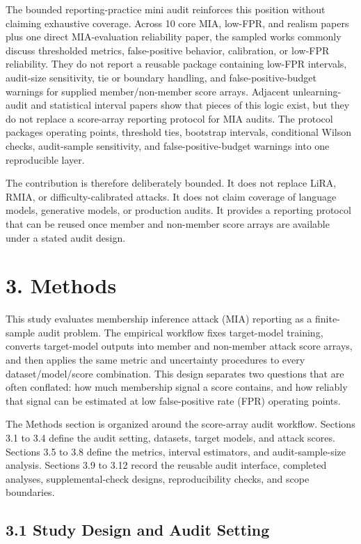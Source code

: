 \documentclass[
  10pt,
  twocolumn]{article}
\begin{document}
The bounded reporting-practice mini audit reinforces this position without claiming exhaustive coverage. Across 10 core MIA, low-FPR, and realism papers plus one direct MIA-evaluation reliability paper, the sampled works commonly discuss thresholded metrics, false-positive behavior, calibration, or low-FPR reliability. They do not report a reusable package containing low-FPR intervals, audit-size sensitivity, tie or boundary handling, and false-positive-budget warnings for supplied member/non-member score arrays. Adjacent unlearning-audit and statistical interval papers show that pieces of this logic exist, but they do not replace a score-array reporting protocol for MIA audits. The protocol packages operating points, threshold ties, bootstrap intervals, conditional Wilson checks, audit-sample sensitivity, and false-positive-budget warnings into one reproducible layer.

The contribution is therefore deliberately bounded. It does not replace LiRA, RMIA, or difficulty-calibrated attacks. It does not claim coverage of language models, generative models, or production audits. It provides a reporting protocol that can be reused once member and non-member score arrays are available under a stated audit design.

\hypertarget{methods}{%
\section{3. Methods}\label{methods}}

This study evaluates membership inference attack (MIA) reporting as a finite-sample audit problem. The empirical workflow fixes target-model training, converts target-model outputs into member and non-member attack score arrays, and then applies the same metric and uncertainty procedures to every dataset/model/score combination. This design separates two questions that are often conflated: how much membership signal a score contains, and how reliably that signal can be estimated at low false-positive rate (FPR) operating points.

The Methods section is organized around the score-array audit workflow. Sections 3.1 to 3.4 define the audit setting, datasets, target models, and attack scores. Sections 3.5 to 3.8 define the metrics, interval estimators, and audit-sample-size analysis. Sections 3.9 to 3.12 record the reusable audit interface, completed analyses, supplemental-check designs, reproducibility checks, and scope boundaries.

\hypertarget{study-design-and-audit-setting}{%
\subsection{3.1 Study Design and Audit Setting}\label{study-design-and-audit-setting}}
\end{document}
